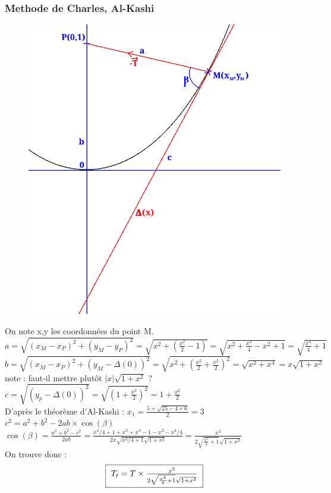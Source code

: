 \documentclass[10pt,a4paper]{article}
\begin{document}
\subsubsection{Methode de Charles, Al-Kashi}
\begin{figure}[H]
	\includegraphics[scale=0.5]{al-kashi.png}
\end{figure}
On note x,y les coordonnées du point M.\\
$a=\sqrt{(x_M-x_P)^2+(y_M-y_P)^2}=\sqrt{x^2+(\frac{x^2}{2}-1)}=\sqrt{x^2+\frac{x^4}{4}-x^2+1}=\sqrt{\frac{x^4}{4}+1}$\\
$b=\sqrt{(x_M-x_P)^2+(y_M-\Delta(0))^2}=\sqrt{x^2+(\frac{x^2}{2}+\frac{x^2}{2})^2}=\sqrt{x^2+x^4}=x\sqrt{1+x^2}$\\
note : faut-il mettre plutôt $|x|\sqrt{1+x^2}$ ?\\
$c=\sqrt{(y_p-\Delta(0))^2}=\sqrt{(1+\frac{x^2}{2})^2}=1+\frac{x^2}{2}$\\
D'après le théorème d'Al-Kashi : 
$x_1 = \frac{5 + \sqrt{25 - 4 \times 6}}{2} = 3$\\
$c^2 = a^2 + b^2 - 2ab\times\cos(\beta)$\\
$\cos(\beta)=\frac{a^2+b^2-c^2}{2ab}=\frac{x^4/4+1+x^2+x^4-1-x^2-x^4/4}{2x\sqrt{x^4/4+1}\sqrt{1+x^2}}=\frac{x^3}{2\sqrt{\frac{x^4}{4}+1}\sqrt{1+x^2}}$\\
On trouve donc :
\[\fbox{ $T_t=T\times\frac{x^3}{2\sqrt{\frac{x^4}{4}+1}\sqrt{1+x^2}}$ }\]\\
\end{document}
